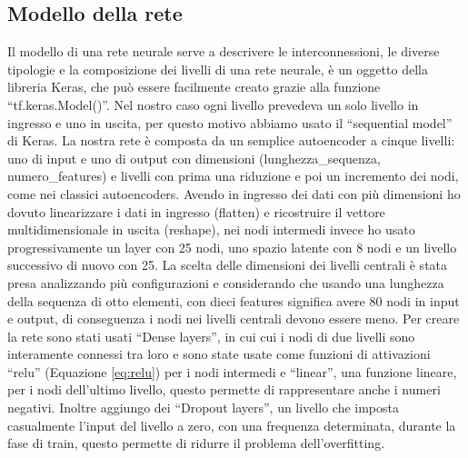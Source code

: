 \subsection{Modello della rete}


Il modello di una rete neurale serve a descrivere le interconnessioni, le diverse tipologie e la composizione dei livelli di una rete neurale, è un oggetto della libreria Keras, che può essere facilmente creato grazie alla funzione ``tf.keras.Model()''.
Nel nostro caso ogni livello prevedeva un solo livello in ingresso e uno in uscita, per questo motivo abbiamo usato il ``sequential model'' di Keras.
La nostra rete è composta da un semplice autoencoder a cinque livelli: uno di input e uno di output con dimensioni (lunghezza\_sequenza, numero\_features) e livelli con prima una riduzione e poi un incremento dei nodi, come nei classici autoencoders.
Avendo in ingresso dei dati con più dimensioni ho dovuto linearizzare i dati in ingresso (flatten) e ricostruire il vettore multidimensionale in uscita (reshape), nei nodi intermedi invece ho usato progressivamente un layer con 25 nodi, uno spazio latente con 8 nodi e un livello successivo di nuovo con 25. La scelta delle dimensioni dei livelli centrali è stata presa analizzando più configurazioni e considerando che usando una lunghezza della sequenza di otto elementi, con dieci features significa avere 80 nodi in input e output, di conseguenza i nodi nei livelli centrali devono essere meno.
Per creare la rete sono stati usati ``Dense layers'', in cui cui i nodi di due livelli sono interamente connessi tra loro e sono state usate come funzioni di attivazioni ``relu'' (Equazione \ref{eq:relu}) per i nodi intermedi e ``linear'', una funzione lineare, per i nodi dell'ultimo livello, questo permette di rappresentare anche i numeri negativi.
Inoltre aggiungo dei ``Dropout layers'', un livello che imposta casualmente l'input del livello a zero, con una frequenza determinata, durante la fase di train, questo permette di ridurre il problema dell'overfitting.

